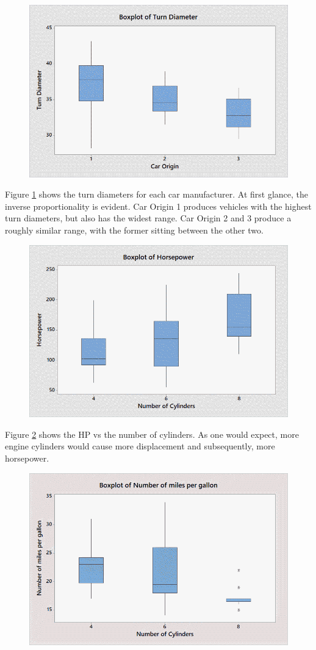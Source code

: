 \documentclass[10pt,a4paper]{article}
\begin{document}
\begin{figure}[tb]
	\centering
	\includegraphics[width=0.75\linewidth]{box-td_vs_orig.png}
	\caption{}
	\label{fig:td-vs-orig}
\end{figure}

Figure \ref{fig:td-vs-orig} shows the turn diameters for each car manufacturer. At first glance, the inverse proportionality is evident. Car Origin 1 produces vehicles with the highest turn diameters, but also has the widest range. Car Origin 2 and 3 produce a roughly similar range, with the former sitting between the other two.

\begin{figure}[tb]
	\centering
	\includegraphics[width=0.75\linewidth]{box-hp_vs_cyl.png}
	\caption{}
	\label{fig:hp-vs-cyl}
\end{figure}

Figure \ref{fig:hp-vs-cyl} shows the HP vs the number of cylinders. As one would expect, more engine cylinders would cause more displacement and subsequently, more horsepower. 

\begin{figure}[tb]
	\centering
	\includegraphics[width=0.75\linewidth]{box-mpg_vs_cyl.png}
	\caption{}
	\label{fig:mpg-vs-cyl}
\end{figure}
\end{document}
